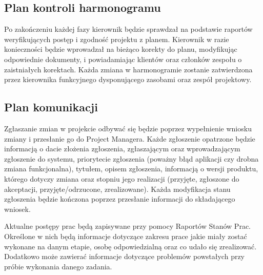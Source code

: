 \subsection*{Plan kontroli harmonogramu}
Po zakończeniu każdej fazy kierownik będzie sprawdzał na podstawie raportów weryfikujących postęp i zgodność projektu z planem. Kierownik w razie konieczności będzie wprowadzał na bieżąco korekty do planu, modyfikując odpowiednie dokumenty, i powiadamiając klientów oraz członków zespołu o zaistniałych korektach. Każda zmiana w harmonogramie zostanie zatwierdzona przez kierownika funkcyjnego dysponującego zasobami oraz zespół projektowy.


\subsection*{Plan komunikacji}
	Zgłaszanie zmian w projekcie odbywać się będzie poprzez wypełnienie wniosku zmiany i przesłanie go do Project Managera. Każde zgłoszenie opatrzone będzie informacją o dacie złożenia zgłoszenia, zgłaszającym oraz wprowadzającym zgłoszenie do systemu, priorytecie zgłoszenia (poważny błąd aplikacji czy drobna zmiana funkcjonalna), tytułem, opisem zgłoszenia, informacją o wersji produktu, którego dotyczy zmiana oraz stopniu jego realizacji (przyjęte, zgłoszone do akceptacji, przyjęte/odrzucone, zrealizowane). Każda modyfikacja stanu zgłoszenia będzie kończona poprzez przesłanie informacji do składającego wniosek. 

	Aktualne postępy prac będą zapisywane przy pomocy Raportów Stanów Prac. Określone w nich będą informacje dotyczące zakresu prace jakie miały zostać wykonane na danym etapie, osobę odpowiedzialną oraz co udało się zrealizować. Dodatkowo może zawierać informacje dotyczące problemów powstałych przy próbie wykonania danego zadania.

